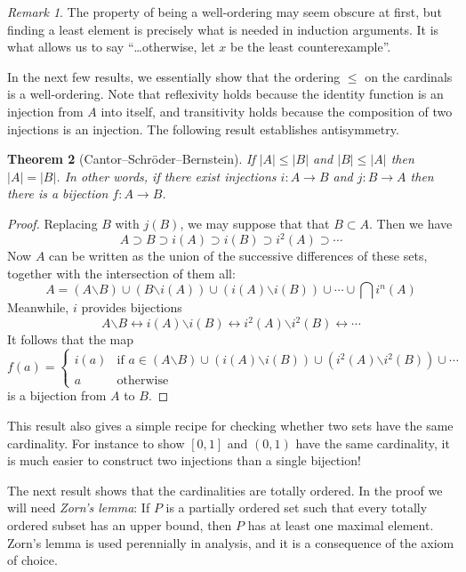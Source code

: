 \documentclass[11pt,oneside]{amsbook}
\theoremstyle{definition}
\theoremstyle{plain}
\newtheorem{theorem}{Theorem}[section]
\theoremstyle{definition}
\theoremstyle{remark}
\newtheorem{remark}[theorem]{Remark}
\numberwithin{equation}{section}
\numberwithin{figure}{section}
\begin{document}
\begin{remark}
  The property of being a well-ordering may seem obscure at first, but finding a least element is precisely what is needed in induction arguments. It is what allows us to say ``\ldots otherwise, let $x$ be the least counterexample''.
\end{remark}

In the next few results, we essentially show that the ordering $\leq$ on the cardinals is a well-ordering. Note that reflexivity holds because the identity function is an injection from $A$ into itself, and transitivity holds because the composition of two injections is an injection. The following result establishes antisymmetry.

\begin{theorem}[Cantor--Schr\"oder--Bernstein]
  \label{thm:csb}
  If $|A|\leq|B|$ and $|B|\leq|A|$ then $|A|=|B|$. In other words, if there exist injections $i\colon A\to B$ and $j\colon B\to A$ then there is a bijection $f\colon A\to B$.
\end{theorem}

\begin{proof}
  Replacing $B$ with $j(B)$, we may suppose that that $B\subset A$. Then we have
  \[A\supset B\supset i(A)\supset i(B)\supset i^2(A)\supset\cdots
  \]
  Now $A$ can be written as the union of the successive differences of these sets, together with the intersection of them all:
  \[A=(A\mathord{\smallsetminus}B)\cup(B\mathord{\smallsetminus}i(A))
  \cup(i(A)\mathord{\smallsetminus}i(B))\cup\cdots\cup \bigcap i^n(A)
  \]
  Meanwhile, $i$ provides bijections
  \[A\mathord{\smallsetminus}B\leftrightarrow i(A)\mathord{\smallsetminus}i(B)\leftrightarrow i^2(A)\mathord{\smallsetminus}i^2(B)\leftrightarrow\cdots
  \]
  It follows that the map
  \[f(a)=\begin{cases}i(a)&\text{if }a\in(A\mathord{\smallsetminus}B)\cup(i(A)\mathord{\smallsetminus}i(B))\cup(i^2(A)\mathord{\smallsetminus}i^2(B))\cup\cdots\\
    a&\text{otherwise}
  \end{cases}
  \]
  is a bijection from $A$ to $B$.
\end{proof}

This result also gives a simple recipe for checking whether two sets have the same cardinality. For instance to show $[0,1]$ and $(0,1)$ have the same cardinality, it is much easier to construct two injections than a single bijection!

The next result shows that the cardinalities are totally ordered. In the proof we will need \emph{Zorn's lemma}: If $P$ is a partially ordered set such that every totally ordered subset has an upper bound, then $P$ has at least one maximal element.  Zorn's lemma is used perennially in analysis, and it is a consequence of the axiom of choice.
\end{document}
